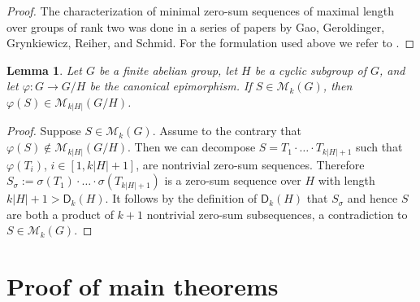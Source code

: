 \documentclass[11pt]{amsart}
\newtheorem{lemma}[theorem]{Lemma}
\theoremstyle{definition}
\numberwithin{equation}{section}
\begin{document}
\begin{proof}
	The characterization of minimal zero-sum sequences of maximal length over groups of rank two was done in a series of papers by   Gao, Geroldinger, Grynkiewicz, Reiher, and Schmid. For the formulation used above we refer to \cite[Main Proposition 5.4]{Ge-Gr-Yu15}.
\end{proof}






\begin{lemma}\label{le-epi}
	Let $G$ be a finite abelian group, let $H$ be a cyclic subgroup of $G$, and let $\varphi\colon G\rightarrow G/H$ be the canonical epimorphism.
	If $S\in \mathcal M_k(G)$, then $\varphi(S)\in \mathcal M_{k|H|}(G/H)$.
\end{lemma}

 \begin{proof}
 	Suppose $S\in \mathcal M_k(G)$. Assume to the contrary that $\varphi(S)\not\in \mathcal M_{k|H|}(G/H)$. Then we can decompose $S=T_1\cdot\ldots\cdot T_{k|H|+1}$ such that $\varphi(T_i)$, $i\in [1, k|H|+1]$, are nontrivial zero-sum sequences. Therefore $S_{\sigma}:=\sigma(T_1)\cdot\ldots\cdot \sigma(T_{k|H|+1})$ is a zero-sum sequence over $H$ with length $k|H|+1>\mathsf D_k(H)$. It follows by the definition of $\mathsf D_k(H)$ that $S_{\sigma}$ and hence $S$ are both a product of $k+1$ nontrivial zero-sum subsequences, a contradiction to $S\in \mathcal M_k(G)$.
 \end{proof}


 




\section{Proof of main theorems}\label{sec-k=n-1}
\end{document}
